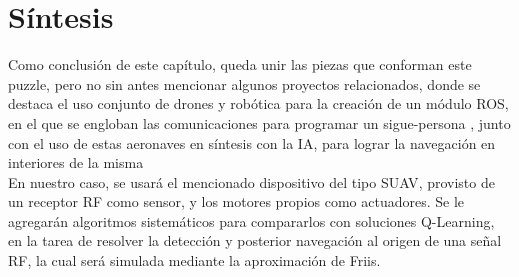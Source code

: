 \section{Síntesis}
\label{subsec:sintesis}

Como conclusión de este capítulo, queda unir las piezas que conforman este puzzle, pero no sin antes mencionar algunos proyectos relacionados, donde se destaca el uso conjunto de drones y robótica para la creación de un módulo ROS, en el que se engloban las comunicaciones para programar un sigue-persona \cite{tfm-pedro}, junto con el uso de estas aeronaves en síntesis con la \ac{IA}, para lograr la navegación en interiores de la misma \cite{paper-ia-dron}\\

En nuestro caso, se usará el mencionado dispositivo del tipo \ac{SUAV}, provisto de un receptor \ac{RF} como sensor, y los motores propios como actuadores. Se le agregarán algoritmos sistemáticos para compararlos con soluciones Q-Learning, en la tarea de resolver la detección y posterior navegación al origen de una señal \ac{RF}, la cual será simulada mediante la aproximación de Friis.